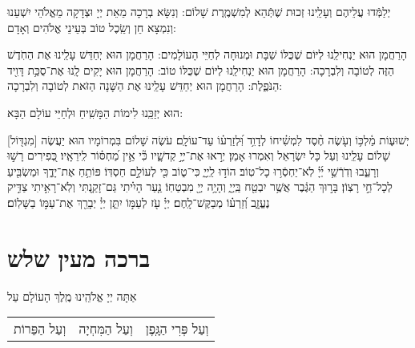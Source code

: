 \documentclass[a4paper, twoside, openany, parskip=half, 10pt]{article}
\begin{document}
\begin{multicols}{2}
\begin{sometimes}
\end{sometimes} 

 יְלַמְּֿדוּ עֲלֵיהֶם וְעָלֵֽינוּ זְכוּת שֶׁתְּֿהֵא לְמִשְׁמֶֽרֶת שָׁלוֹם: וְנִשָּׂא בְרָכָה מֵאֵת יְיָ וּצְדָקָה מֵאֱלֹהֵי יִשְׁעֵנוּ וְנִמְצָא חֵן וְשֵֽׂכֶל טוֹב בְּעֵינֵי אֱלֹהִים וְאָדָם:\\

\begin{sometimes}

\shabbos
 הָרַחֲמָן הוּא יַנְחִילֵֽנוּ לְיּוֹם שֶׁכֻּלּוֹ שַׁבָּת וּמְנוּחָה לְחַיֵּי הָעוֹלָמִים: 
 הָרַחֲמָן הוּא יְחַדֵּשׁ עָלֵֽינוּ אֶת הַחֹֽדֶשׁ הַזֶּה לְטוֹבָה וְלִבְרָכָה:
	 הָרַחֲמָן הוּא יַנְחִילֵֽנוּ לְיּוֹם שֶׁכֻּלּוֹ טוֹב:\hfill \break
{}
 הָרַחֲמָן הוּא יָקִים לָֽנוּ אֶת־סֻכַּ֥ת דָּוִ֖יד הַנֹּפֶ֑לֶת:\hfill \break
{}
	 הָרַחֲמָן הוּא יְחַדֵּשׁ עָלֵֽינוּ אֶת הַשָּׁנָה הַזֹּאת לְטוֹבָה וְלִבְרָכָה:
	 
\end{sometimes}

 הוּא יְזַכֵּֽנוּ לִימוֹת הַמָּשִֽׁיחַ וּלְחַיֵּי עוֹלָם הַבָּא: 
 
 

 
 [מִגְדּ֖וֹל] יְשׁוּע֢וֹת מַ֫לְכּ֥וֹ וְעֹ֤שֶׂה חֶ֨סֶד לִמְשִׁ֗יחוֹ לְדָוִ֥ד וּֽ֝לְזַרְע֗וֹ עַד־עוֹלָֽם׃ עֹשֶׂה שָׁלוֹם בִּמְרוֹמָיו הוּא יַעֲשֶׂה שָׁלוֹם עָלֵֽינוּ וְעַל כָּל יִשְׂרָאֵל וְאִמְרוּ אָמֵן׃
יְר֣אוּ אֶת־יְיָ֣ קְדשָׁ֑יו כִּ֘י אֵ֥ין מַ֝חְסּ֗וֹר לִֽירֵאָֽיו׃ 
כְּ֭פִירִים רָשׁ֣וּ וְרָעֵ֑בוּ וְדֹֽרְֿשֵׁ֥י יְ֜יָ֗ לֹֽא־יַחְסְֿר֥וּ כָל־טֽוֹב׃ 
הוֹד֣וּ לַֽיְיָ֑ כִּי־ט֑וֹב כִּ֖י לְעוֹלָ֣ם חַסְדּֽוֹ׃ פּוֹתֵ֥חַ אֶת־יָדֶ֑ךָ וּמַשְׂבִּ֖יעַ לְכָל־חַ֣י רָצֽוֹן׃ בָּר֣וּךְ הַגֶּ֔בֶר אֲשֶׁ֥ר יִבְטַ֖ח בַּֽיְיָ֑ וְהָיָ֥ה יְיָ֖ מִבְטַחֽוֹ׃ נַ֤עַר הָיִ֗יתִי גַּם־זָקַ֥נְתִּי וְלֹֽא־רָאִ֣יתִי צַדִּ֣יק נֶעֱזָ֑ב וְ֝זַרְע֗וֹ מְבַקֶּשׁ־לָֽחֶם׃ יְיָ֗ עֹ֖ז לְעַמּ֣וֹ יִתֵּ֑ן יְיָ֓ יְבָרֵ֖ךְ אֶת־עַמּ֣וֹ בַשָּׁלֽוֹם׃

\end{multicols}

\clearpage

\section[ברכה מעין שלש]{ ברכה מעין שלש }


 אַתָּה יְיָ אֱלֹהֵֽינוּ מֶֽלֶךְ הָעוֹלָם עַל\\ 
 \begin{tabular}{c|c|c}
וְעַל הַפֵּרוֹת & וְעַל הַמִּחְיָה & וְעַל פְּרִי הַגָּֽפֶן\\
\end{tabular}
\end{document}
